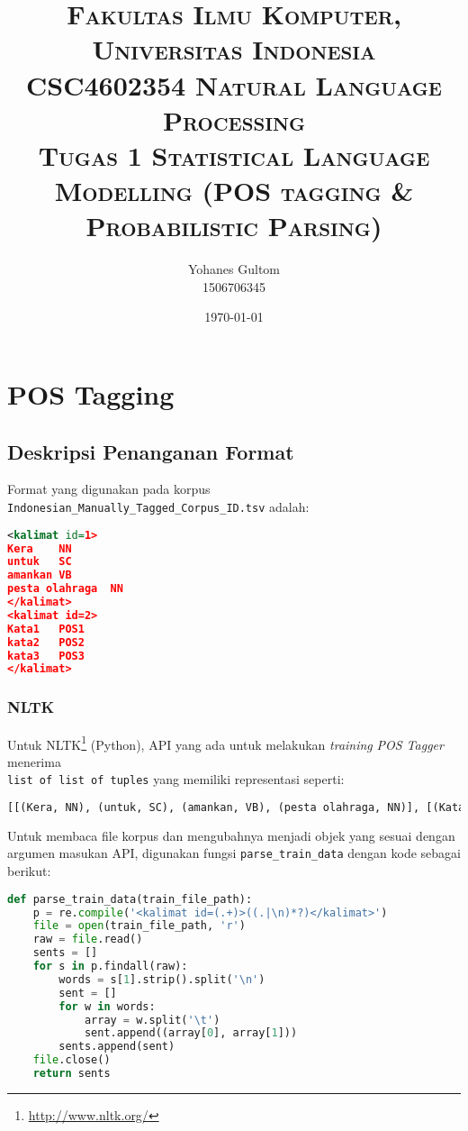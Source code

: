 \documentclass[paper=a4, fontsize=11pt]{scrartcl} %
\title{	
\normalfont \normalsize 
\textsc{Fakultas Ilmu Komputer, Universitas Indonesia} \\ [8pt]  \textsc{CSC4602354  Natural Language Processing} \\ [8pt] 
\textsc {Tugas 1 Statistical Language Modelling (POS tagging \& Probabilistic Parsing)}
}
\author{	
	\small Yohanes Gultom \\
	\small 1506706345
} %
\date{\normalsize\today} %
\numberwithin{equation}{section} %
\numberwithin{figure}{section} %
\numberwithin{table}{section} %
\begin{document}
\maketitle %


\section{POS Tagging}


\subsection{Deskripsi Penanganan Format}

Format yang digunakan pada korpus \verb|Indonesian_Manually_Tagged_Corpus_ID.tsv| adalah:

\begin{lstlisting}[language=XML]
<kalimat id=1>
Kera	NN
untuk	SC
amankan	VB
pesta olahraga	NN
</kalimat>
<kalimat id=2>
Kata1	POS1
kata2	POS2
kata3	POS3
</kalimat>
\end{lstlisting}

\subsubsection{NLTK}

Untuk NLTK\footnote{\url{http://www.nltk.org/}} (Python), API yang ada untuk melakukan \textit{training} \textit{POS Tagger} menerima \\\verb|list of list of tuples| yang memiliki representasi seperti:

\begin{lstlisting}[language=Python]
[[(Kera, NN), (untuk, SC), (amankan, VB), (pesta olahraga, NN)], [(Kata1, POS1), (Kata2, POS2), (Kata3, POS3)]]
\end{lstlisting}

Untuk membaca file korpus dan mengubahnya menjadi objek yang sesuai dengan argumen masukan API, digunakan fungsi \verb|parse_train_data| dengan kode sebagai berikut:

\begin{lstlisting}[language=Python]
def parse_train_data(train_file_path):
	p = re.compile('<kalimat id=(.+)>((.|\n)*?)</kalimat>')
	file = open(train_file_path, 'r')
	raw = file.read()
	sents = []
	for s in p.findall(raw):
		words = s[1].strip().split('\n')
		sent = []
		for w in words:
			array = w.split('\t')
			sent.append((array[0], array[1]))
		sents.append(sent)
	file.close()
	return sents
\end{lstlisting}
\end{document}
